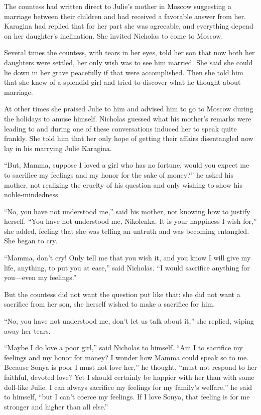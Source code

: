 The countess had written direct to Julie's mother in Moscow
suggesting a marriage between their children and had received a
favorable answer from her. Karagina had replied that for her part
she was agreeable, and everything depend on her daughter's
inclination. She invited Nicholas to come to Moscow.

Several times the countess, with tears in her eyes, told her son
that now both her daughters were settled, her only wish was to
see him married. She said she could lie down in her grave
peacefully if that were accomplished. Then she told him that she
knew of a splendid girl and tried to discover what he thought
about marriage.

At other times she praised Julie to him and advised him to go to
Moscow during the holidays to amuse himself. Nicholas guessed
what his mother's remarks were leading to and during one of these
conversations induced her to speak quite frankly. She told him
that her only hope of getting their affairs disentangled now lay
in his marrying Julie Karagina.

``But, Mamma, suppose I loved a girl who has no fortune, would
you expect me to sacrifice my feelings and my honor for the sake
of money?'' he asked his mother, not realizing the cruelty of his
question and only wishing to show his noble-mindedness.

``No, you have not understood me,'' said his mother, not knowing
how to justify herself. ``You have not understood me,
Nikolenka. It is your happiness I wish for,'' she added, feeling
that she was telling an untruth and was becoming entangled. She
began to cry.

``Mamma, don't cry! Only tell me that you wish it, and you know I
will give my life, anything, to put you at ease,'' said
Nicholas. ``I would sacrifice anything for you---even my
feelings.''

But the countess did not want the question put like that: she did
not want a sacrifice from her son, she herself wished to make a
sacrifice for him.

``No, you have not understood me, don't let us talk about it,''
she replied, wiping away her tears.

``Maybe I do love a poor girl,'' said Nicholas to himself. ``Am I
to sacrifice my feelings and my honor for money? I wonder how
Mamma could speak so to me. Because Sonya is poor I must not love
her,'' he thought, ``must not respond to her faithful, devoted
love? Yet I should certainly be happier with her than with some
doll-like Julie. I can always sacrifice my feelings for my
family's welfare,'' he said to himself, ``but I can't coerce my
feelings. If I love Sonya, that feeling is for me stronger and
higher than all else.''


